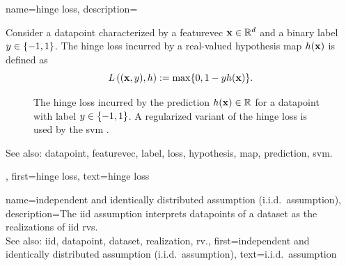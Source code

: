{name={hinge loss}, 
	description={Consider a \gls{datapoint} 
		characterized by a \gls{featurevec} ${\bf x} \in \mathbb{R}^{d}$ and a 
		binary \gls{label} $y \in \{-1,1\}$. The hinge \gls{loss} incurred by a real-valued 
		\gls{hypothesis} \gls{map} $h({\bf x})$ is defined as 
		\begin{equation} 
			\label{equ_hinge_loss_gls_dict}
				L\left(({\bf x},y),h \right) := \max \{ 0 , 1 - y h({\bf x}) \}. 
			\end{equation}
\begin{figure}[H]
\begin{center}
\caption{The hinge \gls{loss} incurred by the \gls{prediction} $h({\bf x}) \in \mathbb{R}$ 
for a \gls{datapoint} with \gls{label} $y \in \{-1,1\}$. A regularized variant of the hinge 
\gls{loss} is used by the \gls{svm} \cite{LampertNowKernel}.}
\label{fig_hingeloss_dict}
\end{center}
\end{figure} 	    
		See also: \gls{datapoint}, \gls{featurevec}, \gls{label}, \gls{loss}, \gls{hypothesis}, \gls{map}, \gls{prediction}, \gls{svm}.
		},
		first={hinge loss},
		text={hinge loss}
}

{name={independent and identically distributed assumption (i.i.d.\ assumption)}, 
	description={The \gls{iid} assumption interprets \glspl{datapoint} of a \gls{dataset} as the 
		\glspl{realization} of \gls{iid} \glspl{rv}.
				\\
		See also: \gls{iid}, \gls{datapoint}, \gls{dataset}, \gls{realization}, \gls{rv}.},
		first={independent and identically distributed assumption (i.i.d.\ assumption)},
		text={i.i.d.\ assumption} 
}

